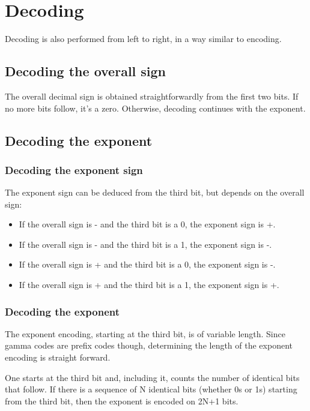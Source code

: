 \documentclass{acm_proc_article-sp}
\begin{document}
\section{Decoding}
\label{section-decoding}

Decoding is also performed from left to right, in a way similar to encoding.

\subsection{Decoding the overall sign}

The overall decimal sign is obtained straightforwardly from the first two bits. If no more bits follow, it's a zero. Otherwise, decoding continues with the exponent.

\subsection{Decoding the exponent}

\subsubsection{Decoding the exponent sign}

The exponent sign can be deduced from the third bit, but depends on the overall sign:

\begin{itemize}
\item If the overall sign is - and the third bit is a 0, the exponent sign is +.
\item If the overall sign is - and the third bit is a 1, the exponent sign is -.
\item If the overall sign is + and the third bit is a 0, the exponent sign is -.
\item If the overall sign is + and the third bit is a 1, the exponent sign is +.
\end{itemize}

\subsubsection{Decoding the exponent}

The exponent encoding, starting at the third bit, is of variable length. Since gamma codes are prefix codes though, determining the length of the exponent encoding is straight forward.

One starts at the third bit and, including it, counts the number of identical bits that follow. If there is a sequence of N identical bits (whether 0s or 1s) starting from the third bit, then the exponent is encoded on 2N+1 bits.
\end{document}
